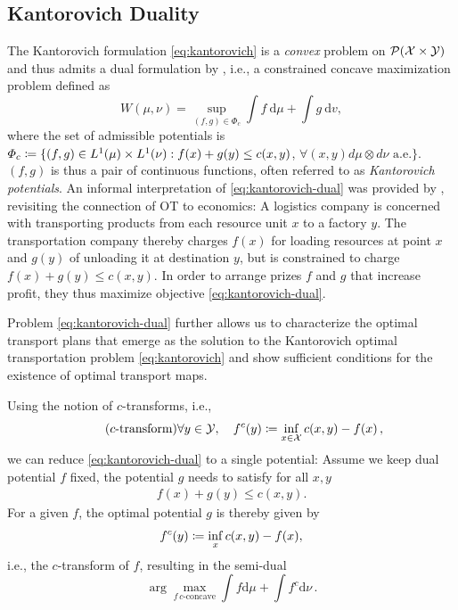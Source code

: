 \subsection{Kantorovich Duality} \label{sec:background_dual}

The Kantorovich formulation \eqref{eq:kantorovich} is a \emph{convex} problem on ${\mathcal{P}}(\mathcal{X} \times \mathcal{Y})$ and thus admits a dual formulation by \citet{kantorovich1942transfer}, i.e., a constrained concave maximization problem defined as
\begin{equation} \label{eq:kantorovich-dual}
    W(\mu, \nu)=\sup _{(f, g) \in \Phi_{c}} \int f \mathrm{~d} \mu+\int g \mathrm{~d} v,
\end{equation}
where the set of admissible potentials is $\Phi_c \coloneqq \{(f, g) \in L^{1}(\mu) \times L^{1}(\nu): f(x)+g(y) \leq c(x,y)$, $\forall(x, y) d\mu \otimes d\nu \text{ a.e.}\}$.
$(f, g)$ is thus a pair of continuous functions, often referred to as \emph{Kantorovich potentials}.
An informal interpretation of \eqref{eq:kantorovich-dual} was provided by \citet{caffarelli2003monge}, revisiting the connection of \acrshort{OT} to economics: 
A logistics company is concerned with transporting products from each resource unit $x$ to a factory $y$. The transportation company thereby charges $f(x)$ for loading resources at point $x$ and $g(y)$ of unloading it at destination $y$, but is constrained to charge $f(x)+g(y) \le c(x,y)$. In order to arrange prizes $f$ and $g$ that increase profit, they thus maximize objective \eqref{eq:kantorovich-dual}.

Problem \eqref{eq:kantorovich-dual} further allows us to characterize the optimal transport plans that emerge as the solution to the Kantorovich optimal transportation problem \eqref{eq:kantorovich} and show sufficient conditions for the existence of optimal transport maps.

Using the notion of $c$-transforms, i.e.,
\begin{equation}
	\tag{$c$-transform}
	\forall y \in \mathcal{Y}, \quad f^c(y) \coloneqq \inf _{x \in \mathcal{X}} c(x, y)-f(x) \,,
\end{equation}
we can reduce \eqref{eq:kantorovich-dual} to a single potential: Assume we keep dual potential $f$ fixed, the potential $g$ needs to satisfy for all $x, y$
\begin{align*}
	f(x) + g(y) \le c(x, y).
\end{align*}
For a given $f$, the optimal potential $g$ is thereby given by
\begin{align*}
	 f^c(y) \coloneqq \inf_x c(x, y) - f(x),
\end{align*}
i.e., the $c$-transform of $f$, resulting in the semi-dual
\begin{equation}\label{eq:semi-dual}
\arg\!\!\max_{f\, c\text{-concave}} \int f \textrm{d}\mu + \int f^c\textrm{d}\nu\,.
\end{equation}

